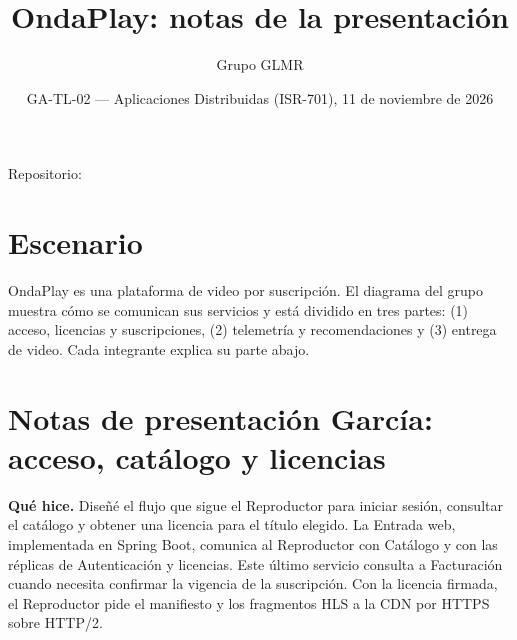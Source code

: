 \documentclass[11pt,a4paper]{article}
\title{OndaPlay: notas de la presentaci\'on}
\author{Grupo GLMR}
\date{GA-TL-02 --- Aplicaciones Distribuidas (ISR-701), 11 de noviembre de 2026}
\begin{document}
	\maketitle
	\begin{center}
		Repositorio: 
	\end{center}
	
	\section*{Escenario}
	OndaPlay es una plataforma de video por suscripci\'on. El diagrama del grupo muestra c\'omo se comunican sus servicios y est\'a dividido en tres partes: (1) acceso, licencias y suscripciones, (2) telemetr\'ia y recomendaciones y (3) entrega de video. Cada integrante explica su parte abajo.
	
	\section*{Notas de presentaci\'on Garc\'ia: acceso, cat\'alogo y licencias}
	\textbf{Qu\'e hice.} Dise\~n\'e el flujo que sigue el Reproductor para iniciar sesi\'on, consultar el cat\'alogo y obtener una licencia para el t\'itulo elegido. La Entrada web, implementada en Spring Boot, comunica al Reproductor con Cat\'alogo y con las r\'eplicas de Autenticaci\'on y licencias. Este \'ultimo servicio consulta a Facturaci\'on cuando necesita confirmar la vigencia de la suscripci\'on. Con la licencia firmada, el Reproductor pide el manifiesto y los fragmentos HLS a la CDN por HTTPS sobre HTTP/2.
\end{document}
